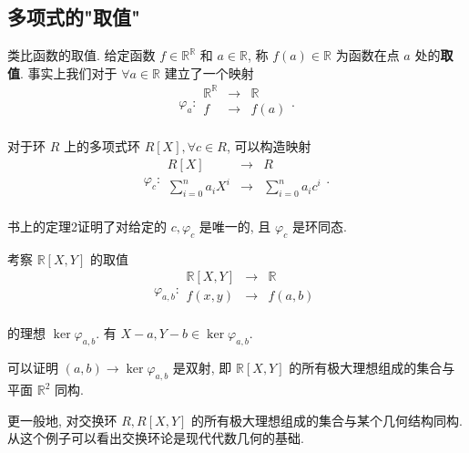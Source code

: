 \documentclass[UTF8]{ctexart}
\begin{document}
\subsection{多项式的"取值"}
类比函数的取值. 给定函数 $f\in\mathbb{R}^\mathbb{R}$ 和 $a\in\mathbb{R}$, 称 $f(a)\in\mathbb{R}$ 为函数在点 $a$ 处的\textbf{取值}. 事实上我们对于 $\forall a\in\mathbb{R}$ 建立了一个映射
\[\varphi_a:\begin{array}{rcl}
    \mathbb{R}^\mathbb{R} & \to & \mathbb{R} \\
    f & \to & f(a) \\
\end{array}.\]

对于环 $R$ 上的多项式环 $R[X],\forall c\in R$, 可以构造映射
\[\varphi_c:\begin{array}{rcl}
    R[X] & \to & R \\
    \sum\limits_{i=0}^{n}a_iX^i & \to & \sum\limits_{i=0}^{n}a_ic^i \\
\end{array}.\]

书上的定理2证明了对给定的 $c,\varphi_c$ 是唯一的, 且 $\varphi_c$ 是环同态.
\begin{example}
    考察 $\mathbb{R}[X,Y]$ 的取值
    \[\varphi_{a,b}:\begin{array}{rcl}
        \mathbb{R}[X,Y] & \to & \mathbb{R} \\
        f(x,y) & \to & f(a,b) \\
    \end{array}\]

    的理想 $\ker\varphi_{a,b}$. 有 $X-a,Y-b\in\ker\varphi_{a,b}$.

    可以证明 $(a,b)\to\ker\varphi_{a,b}$ 是双射, 即 $\mathbb{R}[X,Y]$ 的所有极大理想组成的集合与平面 $\mathbb{R}^2$ 同构.

    更一般地, 对交换环 $R,R[X,Y]$ 的所有极大理想组成的集合与某个几何结构同构. 从这个例子可以看出交换环论是现代代数几何的基础.
\end{example}
\end{document}
